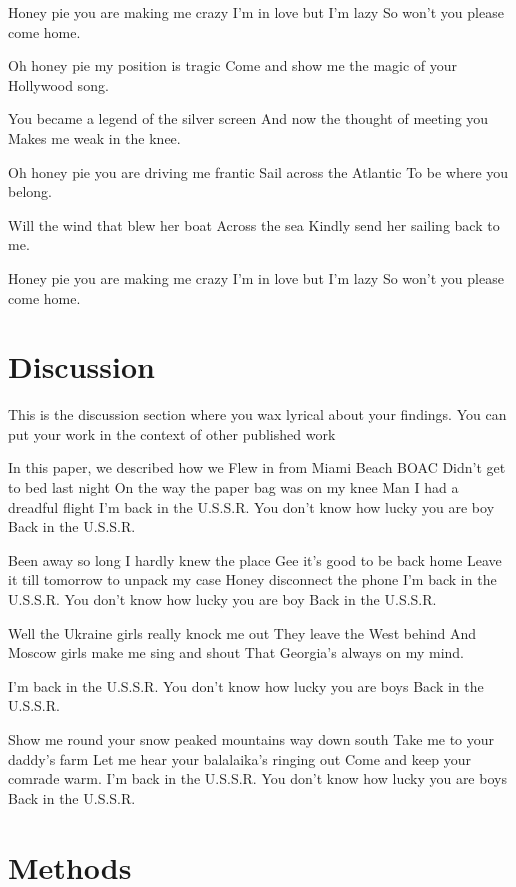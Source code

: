 \documentclass[vruler,JCS]{COB}
\begin{document}
Honey pie you are making me crazy 
I'm in love but I'm lazy
So won't you please come home.

Oh honey pie my position is tragic
Come and show me the magic
of your Hollywood song.

You became a legend of the silver screen
And now the thought of meeting you
Makes me weak in the knee.

Oh honey pie you are driving me frantic
Sail across the Atlantic
To be where you belong.

Will the wind that blew her boat 
Across the sea
Kindly send her sailing back to me.

Honey pie you are making me crazy
I'm in love but I'm lazy
So won't you please come home.

\section{Discussion}\label{s:discussion}

This is the discussion section where you wax lyrical about your findings.
You can put your work in the context of other published work \citep{brenner_uga:_1967}

In this paper, we described how we Flew in from Miami Beach BOAC
Didn't get to bed last night
On the way the paper bag was on my knee
Man I had a dreadful flight
I'm back in the U.S.S.R.
You don't know how lucky you are boy
Back in the U.S.S.R.

Been away so long I hardly knew the place
Gee it's good to be back home
Leave it till tomorrow to unpack my case
Honey disconnect the phone
I'm back in the U.S.S.R.
You don't know how lucky you are boy
Back in the U.S.S.R.

Well the Ukraine girls really knock me out
They leave the West behind
And Moscow girls make me sing and shout
That Georgia's always on my mind.

I'm back in the U.S.S.R.
You don't know how lucky you are boys
Back in the U.S.S.R.

Show me round your snow peaked mountains way down south
Take me to your daddy's farm
Let me hear your balalaika's ringing out
Come and keep your comrade warm.
I'm back in the U.S.S.R. 
You don't know how lucky you are boys
Back in the U.S.S.R.

\section{Methods}\label{s:methods}
\end{document}

